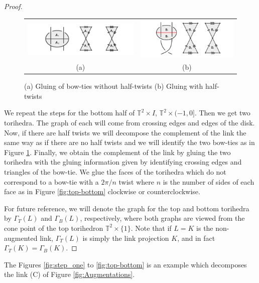 \documentclass[11pt]{amsart}
\newcommand{\torus}{{\mathbb{T}^2}}
\theoremstyle{plain}
\theoremstyle{definition}
\begin{document}
\begin{proof}
\begin{figure}
 \centering
 \begin{tabular}{cc}
 \includegraphics [width=8cm]{falGluing1.png}&
 \includegraphics [width=7cm]{falGluing2.png}\\
 (a)&(b)
 \end{tabular}
	\caption{(a) Gluing of bow-ties without half-twists
	(b) Gluing with half-twists}
 \label{fig:falGluings}
 \end{figure}

\indent We repeat the steps for the bottom half of $\torus \times I$, $\torus \times
(-1,0]$. Then we get two torihedra. The graph of each will come from
crossing edges and edges of the disk. Now, if there are half twists we will
decompose the complement of the link the same way as if there are no half twists
and we will identify the two bow-ties as in Figure \ref{fig:falGluings}.
Finally,
we obtain the complement of the link by gluing the two torihedra with the gluing
information given by identifying crossing edges and triangles of the bow-tie. We
glue the faces of the torihedra which do not correspond to a bow-tie with a
$2\pi/n$ twist where $n$ is the number of sides of each face as in Figure
\ref{fig:top-bottom} clockwise or counterclockwise.


For future reference, we will denote the graph for the top and bottom
torihedra by $\Gamma_T(L)$ and $\Gamma_B(L)$, respectively,
where both graphs are viewed from the cone point of the top torihedron
$\torus \times \{1\}$.
Note that if $L = K$ is the non-augmented link,
$\Gamma_T(L)$ is simply the link projection $K$,
and in fact $\Gamma_T(K) = \Gamma_B(K)$.

\end{proof}



The Figures \ref{fig:step_one} to \ref{fig:top-bottom} is an example which decomposes the link (C) of Figure
\ref{fig:Augmentations}. 
\end{document}
